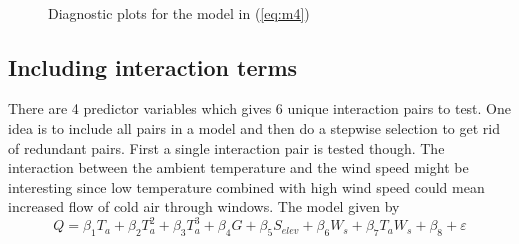 \begin{figure}[ht]
    \centering
    \mbox{ \quad 
          }
    \caption{Diagnostic plots for the model in (\ref{eq:m4})}
    \label{fig:onehouse-m4-diagnostics}
\end{figure}

\subsection*{Including interaction terms}
There are 4 predictor variables which gives 6 unique interaction pairs to test. One idea is to include all pairs in a model and then do a stepwise selection to get rid of redundant pairs. First a single interaction pair is tested though. The interaction between the ambient temperature and the wind speed might be interesting since low temperature combined with high wind speed could mean increased flow of cold air through windows. The model given by
\begin{equation}\label{eq:m5}
    Q = \beta_1T_a + \beta_2T_a^2 + \beta_3T_a^3 +  \beta_4G + \beta_5S_{elev} + \beta_6W_s + \beta_7T_aW_s + \beta_8 + \varepsilon
\end{equation}

